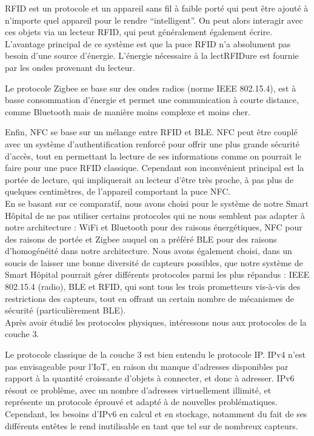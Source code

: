 \documentclass{article}
\begin{document}
RFID est un protocole et un appareil sans fil à faible porté qui peut être ajouté à n’importe quel appareil pour le rendre “intelligent”. On peut alors interagir avec ces objets via un lecteur RFID, qui peut généralement également écrire. L’avantage principal de ce système est que la puce RFID n’a absolument pas besoin d’une source d’énergie. L’énergie nécessaire à la lectRFIDure est fournie par les ondes provenant du lecteur.

Le protocole Zigbee se base sur des ondes radios (norme IEEE 802.15.4), est à basse consommation d’énergie et permet une communication à courte distance, comme Bluetooth mais de manière moins complexe et moins cher.

Enfin, NFC \cite{NFC} se base sur un mélange entre RFID et BLE. NFC peut être couplé avec un système d’authentification renforcé pour offrir une plus grande sécurité d’accès, tout en permettant la lecture de ses informations comme on pourrait le faire pour une puce RFID classique. Cependant son inconvénient principal est la portée de lecture, qui impliquerait au lecteur d'être très proche, à pas plus de quelques centimètres, de l’appareil comportant la puce NFC.
\\

En se basant sur ce comparatif, nous avons choisi pour le système de notre Smart Hôpital de ne pas utiliser certains protocoles qui ne nous semblent pas adapter à notre architecture : WiFi et Bluetooth pour des raisons énergétiques, NFC pour des raisons de portée et Zigbee auquel on a préféré BLE pour des raisons d'homogénéité dans notre architecture. Nous avons également choisi, dans un soucis de laisser une bonne diversité de capteurs possibles, que notre système de Smart Hôpital pourrait gérer différents protocoles parmi les plus répandus : IEEE 802.15.4 (radio), BLE et RFID, qui sont tous les trois prometteurs vis-à-vis des restrictions des capteurs, tout en offrant un certain nombre de mécanismes de sécurité (particulièrement BLE).
\\

Après avoir étudié les protocoles physiques, intéressons nous aux protocoles de la couche 3.

Le protocole classique de la couche 3 est bien entendu le protocole IP. IPv4 n’est pas envisageable pour l’IoT, en raison du manque d’adresses disponibles par rapport à la quantité croissante d’objets à connecter, et donc à adresser. IPv6 \cite{jara2013internet} résout ce problème, avec un nombre d’adresses virtuellement illimité, et représente un protocole éprouvé et adapté à de nouvelles problématiques. Cependant, les besoins d’IPv6 en calcul et en stockage, notamment du fait de ses différents entêtes le rend inutilisable en tant que tel sur de nombreux capteurs.
\end{document}

